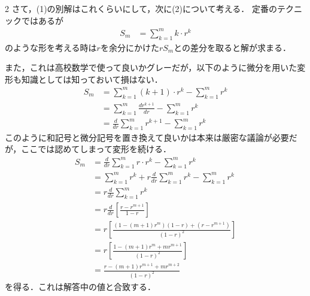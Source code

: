 \documentclass[../../main.tex]{subfiles}
\begin{document}
\begin{multicols}{2}
  さて，(1)の別解はこれくらいにして，次に(2)について考える．
  定番のテクニックではあるが
  \begin{align*}
    S_m & = \sum_{k=1}^m k \cdot r^k
  \end{align*}
  のような形を考える時は$r$を余分にかけた$rS_m$との差分を取ると解が求まる．

  また，これは高校数学で使って良いかグレーだが，以下のように微分を用いた変形も知識としては知っておいて損はない．
  \begin{align*}
    S_m & = \sum_{k=1}^m (k+1) \cdot r^k - \sum_{k=1}^m r^k      \\
        & = \sum_{k=1}^m \frac{d r^{k+1}}{dr} - \sum_{k=1}^m r^k \\
        & = \frac{d}{dr}\sum_{k=1}^m r^{k+1} - \sum_{k=1}^m r^k
  \end{align*}
  このように和記号と微分記号を置き換えて良いかは本来は厳密な議論が必要だが，ここでは認めてしまって変形を続ける．
  \begin{align*}
    S_m
     & = \frac{d}{dr}\sum_{k=1}^m r\cdot r^{k} - \sum_{k=1}^m r^k                \\
     & = \sum_{k=1}^m r^{k} + r\frac{d}{dr}\sum_{k=1}^m r^{k} - \sum_{k=1}^m r^k \\
     & = r\frac{d}{dr}\sum_{k=1}^m r^{k}                                         \\
     & = r\frac{d}{dr}\left[\frac{r-r^{m+1}}{1-r}\right]                         \\
     & = r\left[\frac{(1-(m+1)r^{m})(1-r) + (r-r^{m+1})}{(1-r)^2}\right]         \\
     & = r\left[\frac{1-(m+1)r^{m}+mr^{m+1}}{(1-r)^2}\right]                     \\
     & = \frac{r-(m+1)r^{m+1}+mr^{m+2}}{(1-r)^2}
  \end{align*}
  を得る．これは解答中の値と合致する．

  \newpage
\end{multicols}
\end{document}
